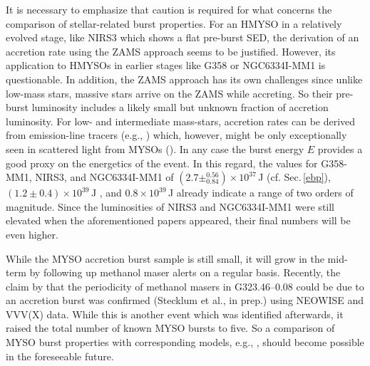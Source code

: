 \documentclass[longauth,usenatbib]{aa}
\begin{document}
It is necessary to emphasize that caution is required for what concerns the comparison of stellar-related burst properties. For an HMYSO in a relatively evolved stage, like NIRS3 which shows a flat pre-burst SED, the derivation of an accretion rate using the ZAMS approach seems to be justified. However, its application to HMYSOs in earlier stages like G358 or NGC6334I-MM1 is questionable.
In addition, the ZAMS approach has its own challenges since unlike low-mass stars, massive stars arrive on the ZAMS while accreting. So their pre-burst luminosity includes a likely small but unknown fraction of accretion luminosity. For low- and intermediate mass-stars, accretion rates can be derived from emission-line tracers (e.g., ) which, however, might be only exceptionally seen in scattered light from MYSOs (). In any case the burst energy $E$ provides a good proxy on the energetics of the event. In this regard, the values for G358-MM1, NIRS3, and NGC6334I-MM1 of $(2.7\pm^{0.56}_{0.84}){\times}10^{37}$\,J (cf. Sec.\,\ref{ebp}), $(1.2\pm{0.4}){\times}10^{39}$\,J , and $0.8{\times}10^{39}$\,J  already indicate a range of two orders of magnitude. Since the luminosities of NIRS3 and NGC6334I-MM1 were still elevated when the aforementioned papers appeared, their final numbers will be even higher.

While the MYSO accretion burst sample is still small, it will grow in the mid-term by following up methanol maser alerts on a regular basis. Recently, the claim by  that the periodicity of methanol masers in G323.46--0.08 could be due to an accretion burst was confirmed (Stecklum et al., in prep.) using NEOWISE and VVV(X) data. While this is another event which was identified afterwards, it raised the total number of known MYSO bursts to five.
So a comparison of MYSO burst properties with corresponding models, e.g., , should become possible in the foreseeable future.
\end{document}
